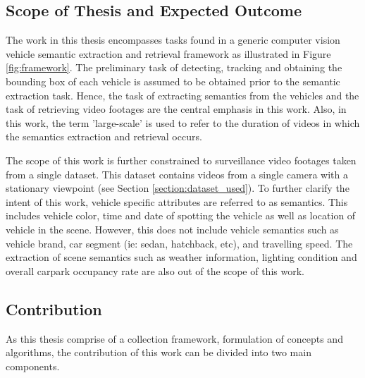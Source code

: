 \subsection{Scope of Thesis and Expected Outcome}
\label{subsec:scope}
The work in this thesis encompasses tasks found in a generic computer vision vehicle semantic extraction and retrieval framework as illustrated in Figure \ref{fig:framework}. The preliminary task of detecting, tracking and obtaining the bounding box of each vehicle is assumed to be obtained prior to the semantic extraction task. Hence, the task of extracting semantics from the vehicles and the task of retrieving video footages are the central emphasis in this work. Also, in this work, the term 'large-scale' is used to refer to the duration of videos in which the semantics extraction and retrieval occurs. 

The scope of this work is further constrained to surveillance video footages taken from a single dataset. This dataset contains videos from a single camera with a stationary viewpoint (see Section \ref{section:dataset_used}). To further clarify the intent of this work, vehicle specific attributes are referred to as semantics. This includes vehicle color, time and date of spotting the vehicle as well as location of vehicle in the scene. However, this does not include vehicle semantics such as vehicle brand, car segment (ie: sedan, hatchback, etc), and travelling speed. The extraction of scene semantics such as weather information, lighting condition and overall carpark occupancy rate are also out of the scope of this work.



\subsection{Contribution}
As this thesis comprise of a collection framework, formulation of concepts and algorithms, the contribution of this work can be divided into two main components. 

